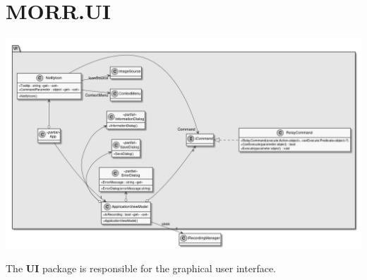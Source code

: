 \begin{packenum}
\end{packenum}
\newpage

\section{MORR.UI}

\begin{center}
    \includegraphics[width=1.0\textwidth]{resources/Packages/UI.png}
\end{center}

The \textbf{UI} package is responsible for the graphical user interface.

\begin{packclass}
\end{packclass}
